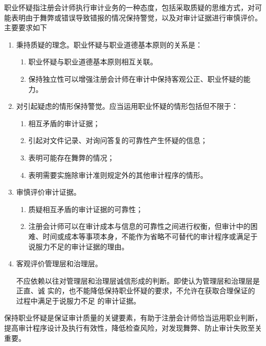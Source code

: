 \documentclass[UTF8,12pt]{ctexart}
\numberwithin{equation}{section} %
\numberwithin{figure}{section}
\numberwithin{table}{section}
\begin{document}
	职业怀疑指注册会计师执行审计业务的一种态度，包括采取质疑的思维方式，对可能表明由于舞弊或错误导致错报的情况保持警觉，以及对审计证据进行审慎评价。主要要求如下
	\begin{enumerate}
		\item 秉持质疑的理念。职业怀疑与职业道德基本原则的关系是：
		\begin{enumerate}
			\item 职业怀疑与职业道德基本原则相互关联。
			
			\item 保持独立性可以增强注册会计师在审计中保持客观公正、职业怀疑的能力。
		\end{enumerate}
		
		\item 对引起疑虑的情形保持警觉。应当运用职业怀疑的情形包括但不限于：
		\begin{enumerate}
			\item 相互矛盾的审计证据；
			
			\item 引起对文件记录、对询问答复的可靠性产生怀疑的信息；
			
			\item 表明可能存在舞弊的情况；
			
			\item 表明需要实施除审计准则规定外的其他审计程序的情形。
		\end{enumerate}
		
		\item 审慎评价审计证据。
		\begin{enumerate}
			\item 质疑相互矛盾的审计证据的可靠性；
			
			\item 注册会计师可以在审计成本与信息的可靠性之间进行权衡，但审计中的困难、时间或成本等事项本身，不能作为省略不可替代的审计程序或满足于说服力不足的审计证据的理由。
		\end{enumerate}
		
		\item 客观评价管理层和治理层。
		
		不应依赖以往对管理层和治理层诚信形成的判断。即使认为管理层和治理层是正直、诚
		实的，也不能降低保持职业怀疑的要求，不允许在获取合理保证的过程中满足于说服力不足
		的审计证据。
	\end{enumerate}
	
	保持职业怀疑是保证审计质量的关键要素，有助于注册会计师恰当运用职业判断，提高审计程序设计及执行有效性，降低检查风险，对发现舞弊、防止审计失败至关重要。
	
\end{document}
